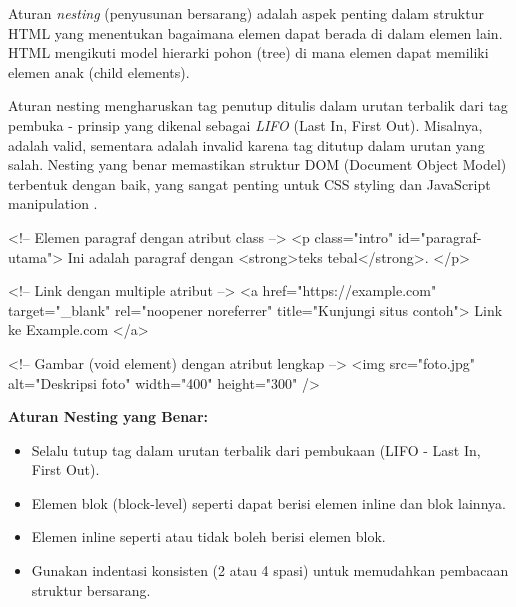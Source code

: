 Aturan \textit{nesting} (penyusunan bersarang) adalah aspek penting dalam struktur HTML yang menentukan bagaimana elemen dapat berada di dalam elemen lain. HTML mengikuti model hierarki pohon (tree) di mana elemen dapat memiliki elemen anak (child elements). 
\begin{sloppypar}
Aturan nesting mengharuskan tag penutup ditulis dalam urutan terbalik dari tag pembuka - prinsip yang dikenal sebagai \textit{LIFO} (Last In, First Out). Misalnya,  adalah valid, sementara  adalah invalid karena tag ditutup dalam urutan yang salah. Nesting yang benar memastikan struktur DOM (Document Object Model) terbentuk dengan baik, yang sangat penting untuk CSS styling dan JavaScript manipulation \cite{mdnHtmlIntro}.
\end{sloppypar}

\begin{webcode}[language=HTML, caption={Contoh Tag, Elemen, dan Atribut}]
<!-- Elemen paragraf dengan atribut class -->
<p class="intro" id="paragraf-utama">
  Ini adalah paragraf dengan <strong>teks tebal</strong>.
</p>

<!-- Link dengan multiple atribut -->
<a href="https://example.com" 
   target="_blank" 
   rel="noopener noreferrer"
   title="Kunjungi situs contoh">
  Link ke Example.com
</a>

<!-- Gambar (void element) dengan atribut lengkap -->
<img src="foto.jpg" 
     alt="Deskripsi foto" 
     width="400" 
     height="300" />
\end{webcode}

\begin{catatan}
\textbf{Aturan Nesting yang Benar:}
\begin{itemize}[leftmargin=*]
  \item Selalu tutup tag dalam urutan terbalik dari pembukaan (LIFO - Last In, First Out).
  \item Elemen blok (block-level) seperti  dapat berisi elemen inline dan blok lainnya.
  \item Elemen inline seperti  atau  tidak boleh berisi elemen blok.
  \item Gunakan indentasi konsisten (2 atau 4 spasi) untuk memudahkan pembacaan struktur bersarang.
\end{itemize}
\end{catatan}

